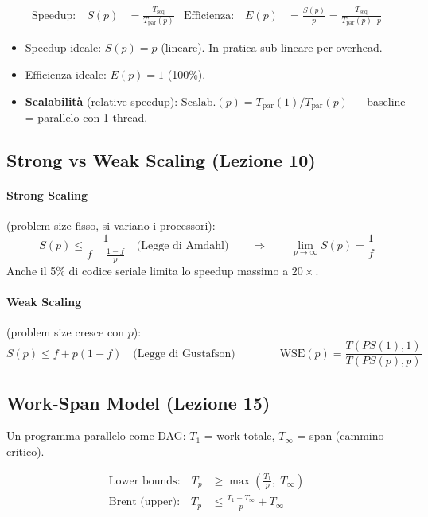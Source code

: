 \documentclass[11pt,a4paper]{article}
\begin{document}
\begin{align}
\text{Speedup:}\quad S(p) &= \frac{T_{\text{seq}}}{T_{\text{par}}(p)} &
\text{Efficienza:}\quad E(p) &= \frac{S(p)}{p} = \frac{T_{\text{seq}}}{T_{\text{par}}(p) \cdot p}
\end{align}

\begin{itemize}[nosep]
  \item Speedup ideale: $S(p) = p$ (lineare). In pratica sub-lineare per overhead.
  \item Efficienza ideale: $E(p) = 1$ (100\%).
  \item \textbf{Scalabilità} (relative speedup): $\text{Scalab.}(p) = T_{\text{par}}(1) / T_{\text{par}}(p)$ --- baseline = parallelo con 1 thread.
\end{itemize}

\subsection{Strong vs Weak Scaling (Lezione 10)}

\paragraph{Strong Scaling} (problem size fisso, si variano i processori):
\[
S(p) \leq \frac{1}{f + \frac{1-f}{p}} \quad\text{(Legge di Amdahl)}
\qquad\Rightarrow\qquad
\lim_{p\to\infty} S(p) = \frac{1}{f}
\]
Anche il 5\% di codice seriale limita lo speedup massimo a $20\times$.

\paragraph{Weak Scaling} (problem size cresce con $p$):
\[
S(p) \leq f + p(1-f) \quad\text{(Legge di Gustafson)}
\qquad\qquad
\text{WSE}(p) = \frac{T(PS(1),1)}{T(PS(p),p)}
\]

\subsection{Work-Span Model (Lezione 15)}

Un programma parallelo come DAG: $T_1$ = work totale, $T_\infty$ = span (cammino critico).

\begin{align}
\text{Lower bounds:}\quad T_p &\geq \max\!\left(\frac{T_1}{p},\; T_\infty\right)\\[4pt]
\text{Brent (upper):}\quad T_p &\leq \frac{T_1 - T_\infty}{p} + T_\infty
\end{align}
\end{document}
